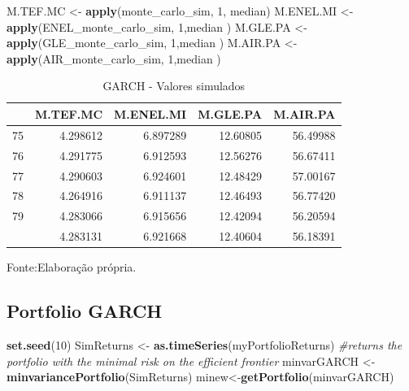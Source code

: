 \documentclass[
  12pt,
  a4paper,
  openany]{book}
\newenvironment{Shaded}{\begin{snugshade}}{\end{snugshade}}
\newcommand{\CommentTok}[1]{\textcolor[rgb]{0.56,0.35,0.01}{\textit{#1}}}
\newcommand{\DecValTok}[1]{\textcolor[rgb]{0.00,0.00,0.81}{#1}}
\newcommand{\KeywordTok}[1]{\textcolor[rgb]{0.13,0.29,0.53}{\textbf{#1}}}
\newcommand{\NormalTok}[1]{#1}
\newcommand{\StringTok}[1]{\textcolor[rgb]{0.31,0.60,0.02}{#1}}
\begin{document}
\scriptsize

\begin{Shaded}
\begin{Highlighting}[]
\NormalTok{M.TEF.MC \textless{}{-}}\StringTok{ }\KeywordTok{apply}\NormalTok{(monte\_carlo\_sim, }\DecValTok{1}\NormalTok{, median)}
\NormalTok{M.ENEL.MI \textless{}{-}}\StringTok{ }\KeywordTok{apply}\NormalTok{(ENEL\_monte\_carlo\_sim, }\DecValTok{1}\NormalTok{,median )}
\NormalTok{M.GLE.PA \textless{}{-}}\StringTok{ }\KeywordTok{apply}\NormalTok{(GLE\_monte\_carlo\_sim, }\DecValTok{1}\NormalTok{,median )}
\NormalTok{M.AIR.PA \textless{}{-}}\StringTok{ }\KeywordTok{apply}\NormalTok{(AIR\_monte\_carlo\_sim, }\DecValTok{1}\NormalTok{,median )}
\end{Highlighting}
\end{Shaded}

\normalsize
\begin{table}[!h]

\caption{\label{tab:unnamed-chunk-43}GARCH - Valores simulados}
\centering
\begin{tabular}[t]{lrrrr}
\toprule
  & M.TEF.MC & M.ENEL.MI & M.GLE.PA & M.AIR.PA\\
\midrule
75 & 4.298612 & 6.897289 & 12.60805 & 56.49988\\
76 & 4.291775 & 6.912593 & 12.56276 & 56.67411\\
77 & 4.290603 & 6.924601 & 12.48429 & 57.00167\\
78 & 4.264916 & 6.911137 & 12.46493 & 56.77420\\
79 & 4.283066 & 6.915656 & 12.42094 & 56.20594\\
\addlinespace
80 & 4.283131 & 6.921668 & 12.40604 & 56.18391\\
\bottomrule
\end{tabular}
\end{table}
\FloatBarrier
\centering

Fonte:Elaboração própria.

\justifying
\bigskip

\hypertarget{portfolio-garch}{%
\subsection{Portfolio GARCH}\label{portfolio-garch}}

\scriptsize

\begin{Shaded}
\begin{Highlighting}[]
\KeywordTok{set.seed}\NormalTok{(}\DecValTok{10}\NormalTok{)}
\NormalTok{SimReturns \textless{}{-}}\StringTok{ }\KeywordTok{as.timeSeries}\NormalTok{(myPortfolioReturns)}
\CommentTok{\#returns the portfolio with the minimal risk on the efficient frontier}
\NormalTok{minvarGARCH \textless{}{-}}\StringTok{ }\KeywordTok{minvariancePortfolio}\NormalTok{(SimReturns) }
\NormalTok{minew\textless{}{-}}\KeywordTok{getPortfolio}\NormalTok{(minvarGARCH)}
\end{Highlighting}
\end{Shaded}
\end{document}
